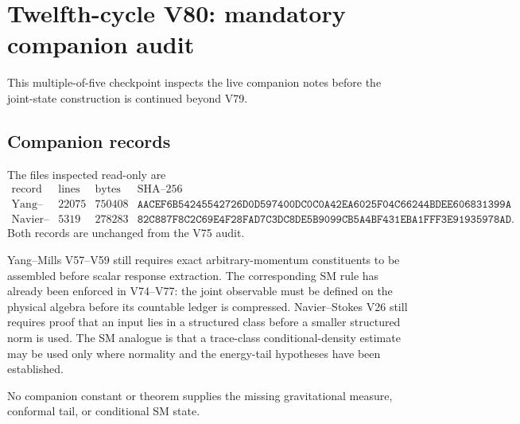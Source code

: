 \documentclass[11pt]{article}
\theoremstyle{remark}
\begin{document}
\section{Twelfth-cycle V80: mandatory companion audit}
\label{sec:v12v80}

This multiple-of-five checkpoint inspects the live companion notes
before the joint-state construction is continued beyond V79.

\subsection{Companion records}

The files inspected read-only are
\[
\begin{array}{c|r|r|c}
\text{record}&\text{lines}&\text{bytes}&\text{SHA--256}\\ \hline
\text{Yang--Mills V59}&22075&750408&
\texttt{AACEF6B54245542726D0D597400DC0C0A42EA6025F04C66244BDEE606831399A}\\
\text{Navier--Stokes V26}&5319&278283&
\texttt{82C887F8C2C69E4F28FAD7C3DC8DE5B9099CB5A4BF431EBA1FFF3E91935978AD}.
\end{array}                                                   \tag{80.1}
\]
Both records are unchanged from the V75 audit.

Yang--Mills V57--V59 still requires exact arbitrary-momentum
constituents to be assembled before scalar response extraction.
The corresponding SM rule has already been enforced in V74--V77:
the joint observable must be defined on the physical algebra before
its countable ledger is compressed.  Navier--Stokes V26 still
requires proof that an input lies in a structured class before a
smaller structured norm is used.  The SM analogue is that a
trace-class conditional-density estimate may be used only where
normality and the energy-tail hypotheses have been established.

No companion constant or theorem supplies the missing gravitational
measure, conformal tail, or conditional SM state.
\end{document}
